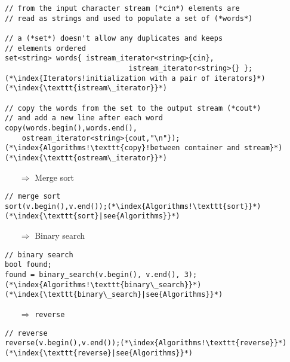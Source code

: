 \documentclass[10pt]{book}
\begin{document}
\begin{lstlisting}
// from the input character stream (*cin*) elements are 
// read as strings and used to populate a set of (*words*)

// a (*set*) doesn't allow any duplicates and keeps
// elements ordered
set<string> words{ istream_iterator<string>{cin},
                             istream_iterator<string>{} };(*\index{Iterators!initialization with a pair of iterators}*)(*\index{\texttt{istream\_iterator}}*)
                             
// copy the words from the set to the output stream (*cout*)
// and add a new line after each word
copy(words.begin(),words.end(),
    ostream_iterator<string>{cout,"\n"});(*\index{Algorithms!\texttt{copy}!between container and stream}*)(*\index{\texttt{ostream\_iterator}}*)
\end{lstlisting}
\begin{enumerate}
\item[$\Rightarrow$] Merge sort
\end{enumerate}
\begin{lstlisting}
// merge sort
sort(v.begin(),v.end());(*\index{Algorithms!\texttt{sort}}*)(*\index{\texttt{sort}|see{Algorithms}}*)
\end{lstlisting}
\begin{enumerate}
\item[$\Rightarrow$] Binary search
\end{enumerate}
\begin{lstlisting}
// binary search
bool found;
found = binary_search(v.begin(), v.end(), 3);(*\index{Algorithms!\texttt{binary\_search}}*)(*\index{\texttt{binary\_search}|see{Algorithms}}*)
\end{lstlisting}
\begin{enumerate}
\item[$\Rightarrow$] \texttt{reverse}
\end{enumerate}
\begin{lstlisting}
// reverse
reverse(v.begin(),v.end());(*\index{Algorithms!\texttt{reverse}}*)(*\index{\texttt{reverse}|see{Algorithms}}*)
\end{lstlisting}
%
%
\end{document}
